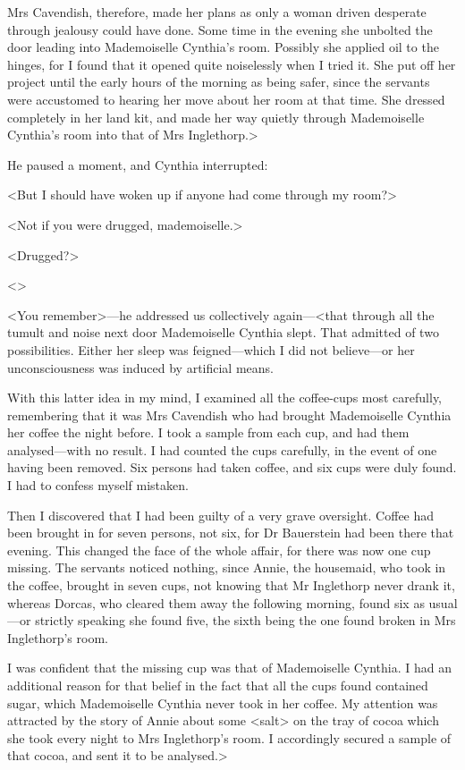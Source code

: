  Mrs Cavendish, therefore, made her plans as only a woman driven desperate through jealousy could have done. Some time in the evening she unbolted the door leading into Mademoiselle Cynthia's room. Possibly she applied oil to the hinges, for I found that it opened quite noiselessly when I tried it. She put off her project until the early hours of the morning as being safer, since the servants were accustomed to hearing her move about her room at that time. She dressed completely in her land kit, and made her way quietly through Mademoiselle Cynthia's room into that of Mrs Inglethorp.> 

 He paused a moment, and Cynthia interrupted: 

 <But I should have woken up if anyone had come through my room?> 

 <Not if you were drugged, mademoiselle.> 

 <Drugged?> 

 <> 

 <You remember>—he addressed us collectively again—<that through all the tumult and noise next door Mademoiselle Cynthia slept. That admitted of two possibilities. Either her sleep was feigned—which I did not believe—or her unconsciousness was induced by artificial means. 

 With this latter idea in my mind, I examined all the coffee-cups most carefully, remembering that it was Mrs Cavendish who had brought Mademoiselle Cynthia her coffee the night before. I took a sample from each cup, and had them analysed—with no result. I had counted the cups carefully, in the event of one having been removed. Six persons had taken coffee, and six cups were duly found. I had to confess myself mistaken. 

 Then I discovered that I had been guilty of a very grave oversight. Coffee had been brought in for seven persons, not six, for Dr Bauerstein had been there that evening. This changed the face of the whole affair, for there was now one cup missing. The servants noticed nothing, since Annie, the housemaid, who took in the coffee, brought in seven cups, not knowing that Mr Inglethorp never drank it, whereas Dorcas, who cleared them away the following morning, found six as usual—or strictly speaking she found five, the sixth being the one found broken in Mrs Inglethorp's room. 

 I was confident that the missing cup was that of Mademoiselle Cynthia. I had an additional reason for that belief in the fact that all the cups found contained sugar, which Mademoiselle Cynthia never took in her coffee. My attention was attracted by the story of Annie about some <salt> on the tray of cocoa which she took every night to Mrs Inglethorp's room. I accordingly secured a sample of that cocoa, and sent it to be analysed.> 


